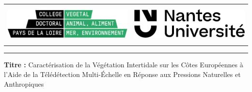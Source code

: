 \documentclass[
  letterpaper,
  11pt,
  english,
  singlespacing,
  headsepline]{MastersDoctoralThesis}
\newcommand{\startonleftwithgap}{%
  \clearpage
  \ifodd\value{page}
    \thispagestyle{empty}\mbox{}\clearpage
    \thispagestyle{empty}\mbox{}\clearpage
    \thispagestyle{empty}\mbox{}\clearpage
  \else
    \thispagestyle{empty}\mbox{}\clearpage
    \thispagestyle{empty}\mbox{}\clearpage
  \fi
}
\newcommand{\chaptertopimage}{Chapter1/img/seagrasses.png}
\newcommand{\chapterbottomimage}{Chapter1/img/seagrasses.png}
\begin{document}
\renewcommand{\chaptertopimage}{Chapter1/img/seagrasses.png}
\renewcommand{\chapterbottomimage}{Chapter1/img/fish_farm_psd.png}

\newpage\null\thispagestyle{empty}\newpage



\startonleftwithgap
{}
\pagestyle{plain}
\thispagestyle{empty}

\renewcommand{\familydefault}{\sfdefault} %


\begin{tabularx}{\textwidth}{X X} %
  \centering\includegraphics[height=2cm]{LogoED.png} & 
  \centering\includegraphics[height=2cm]{LogoUN.jpg} \\
\end{tabularx} 

\vspace{1cm}

\noindent\textcolor[HTML]{2DA86A}{\rule{\textwidth}{5pt}}

\vspace{1cm}

\parbox{17cm}{

{{\fontsize{11}{15}\selectfont \textcolor{greenText}{\textbf{Titre :}}}}
{\fontsize{11}{15}\selectfont Caractérisation de la Végétation Intertidale sur les Côtes Européennes à l'Aide de la Télédétection Multi-Échelle en Réponse aux Pressions Naturelles et Anthropiques}} \\
\end{document}
